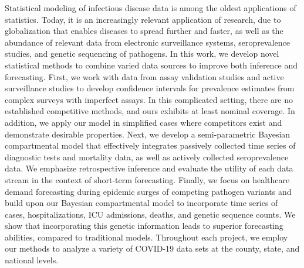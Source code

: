 {%







}

\thesisabstract
{
    Statistical modeling of infectious disease data is among the oldest applications of statistics. Today, it is an increasingly relevant application of research, due to globalization that enables diseases to spread further and faster, as well as the abundance of relevant data from electronic surveillance systems, seroprevalence studies, and genetic sequencing of pathogens. In this work, we develop novel statistical methods to combine varied data sources to improve both inference and forecasting. First, we work with data from assay validation studies and active surveillance studies to develop confidence intervals for prevalence estimates from complex surveys with imperfect assays. In this complicated setting, there are no established competitive methods, and ours exhibits at least nominal coverage. In addition, we apply our model in simplified cases where competitors exist and demonstrate desirable properties. Next, we develop a semi-parametric Bayesian compartmental model that effectively integrates passively collected time series of diagnostic tests and mortality data, as well as actively collected seroprevalence data. We emphasize retrospective inference and evaluate the utility of each data stream in the context of short-term forecasting. Finally, we focus on healthcare demand forecasting during epidemic surges of competing pathogen variants and build upon our Bayesian compartmental model to incorporate time series of cases, hospitalizations, ICU admissions, deaths, and genetic sequence counts. We show that incorporating this genetic information leads to superior forecasting abilities, compared to traditional models. Throughout each project, we employ our methods to analyze a variety of COVID-19 data sets at the county, state, and national levels.
}


